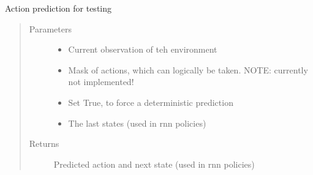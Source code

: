 \documentclass[letterpaper,10pt,english]{sphinxmanual}
\begin{document}
\begin{fulllineitems}
\begin{fulllineitems}
\label{\detokenize{agents.reinforcement_learning:agents.reinforcement_learning.dqn.DQN.predict}}
\sphinxAtStartPar
Action prediction for testing
\begin{quote}\begin{description}
\item[{Parameters}] \leavevmode\begin{itemize}
\item {} 
\sphinxAtStartPar
{} \textendash{} Current observation of teh environment

\item {} 
\sphinxAtStartPar
{} \textendash{} Mask of actions, which can logically be taken. NOTE: currently not implemented!

\item {} 
\sphinxAtStartPar
{} \textendash{} Set True, to force a deterministic prediction

\item {} 
\sphinxAtStartPar
{} \textendash{} The last states (used in rnn policies)

\end{itemize}

\item[{Returns}] \leavevmode
\sphinxAtStartPar
Predicted action and next state (used in rnn policies)

\end{description}\end{quote}

\end{fulllineitems}



\end{fulllineitems}
\end{document}

